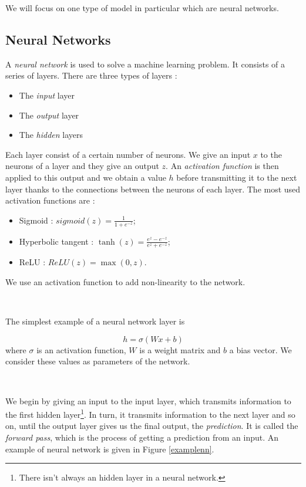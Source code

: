 \documentclass[10pt,a4paper]{article}
\theoremstyle{definition}
\theoremstyle{plain}
\begin{document}
We will focus on one type of model in particular which are neural networks.

\subsection{Neural Networks}


\noindent A \textit{neural network} \cite{5} is used to solve a machine learning problem. It consists of a series of layers. There are three types of layers :

\begin{itemize}
\item The \textit{input} layer
\item The \textit{output} layer
\item The \textit{hidden} layers
\end{itemize}

Each layer consist of a certain number of neurons. We give an input $x$ to the neurons of a layer and they give an output $z$. An \textit{activation function} is then applied to this output and we obtain a value $h$ before transmitting it to the next layer thanks to the connections between the neurons of each layer. The most used activation functions are :
\begin{itemize}
\item Sigmoid : $sigmoid(z) = \frac{1}{1 + e^{-z}}$;
\item Hyperbolic tangent : $\tanh(z) = \frac{e^z - e^{-z}}{e^z + e^{-z}}$;
\item ReLU : $ReLU(z) = \max(0,z)$.
\end{itemize}
We use an activation function to add non-linearity to the network.

~

The simplest example of a neural network layer is 

$$
h = \sigma (Wx +b)
$$
where $\sigma$ is an activation function, $W$ is a weight matrix and $b$ a bias vector. We consider these values as parameters of the network.

~

We begin by giving an input to the input layer, which transmits information to the first hidden layer\footnote{There isn't always an hidden layer in a neural network.}. In turn, it transmits information to the next layer and so on, until the output layer gives us the final output, the \textit{prediction}. It is called the \textit{forward pass}, which is the process of getting a prediction from an input. An example of neural network is given in Figure \ref{examplenn}. 
\end{document}

